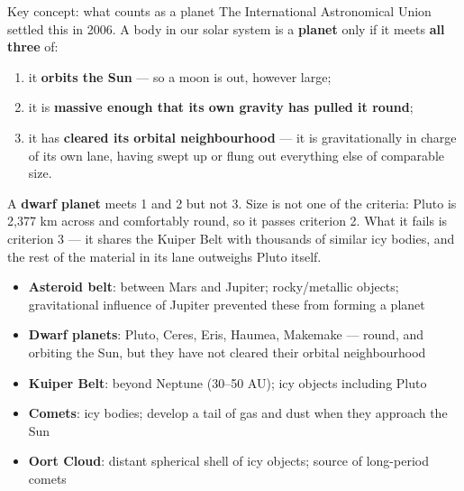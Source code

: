 \documentclass[11pt,a4paper]{article}
\newcommand{\vocab}[1]{\textbf{\textcolor{Space}{#1}}}
\begin{document}
\begin{infobox}{Key concept: what counts as a planet}
The International Astronomical Union settled this in 2006. A body in our solar system is a \vocab{planet} only if it meets \textbf{all three} of:

\medskip
\begin{enumerate}
  \item it \textbf{orbits the Sun} --- so a moon is out, however large;
  \item it is \textbf{massive enough that its own gravity has pulled it round};
  \item it has \textbf{cleared its orbital neighbourhood} --- it is gravitationally in charge of its own lane, having swept up or flung out everything else of comparable size.
\end{enumerate}

\medskip
A \vocab{dwarf planet} meets 1 and 2 but not 3. Size is not one of the criteria: Pluto is 2,377 km across and comfortably round, so it passes criterion 2. What it fails is criterion 3 --- it shares the Kuiper Belt with thousands of similar icy bodies, and the rest of the material in its lane outweighs Pluto itself.
\end{infobox}

\begin{itemize}
  \item \vocab{Asteroid belt}: between Mars and Jupiter; rocky/metallic objects; gravitational influence of Jupiter prevented these from forming a planet
  \item \vocab{Dwarf planets}: Pluto, Ceres, Eris, Haumea, Makemake --- round, and orbiting the Sun, but they have not cleared their orbital neighbourhood
  \item \vocab{Kuiper Belt}: beyond Neptune (30--50 AU); icy objects including Pluto
  \item \vocab{Comets}: icy bodies; develop a tail of gas and dust when they approach the Sun
  \item \vocab{Oort Cloud}: distant spherical shell of icy objects; source of long-period comets
\end{itemize}
\end{document}
